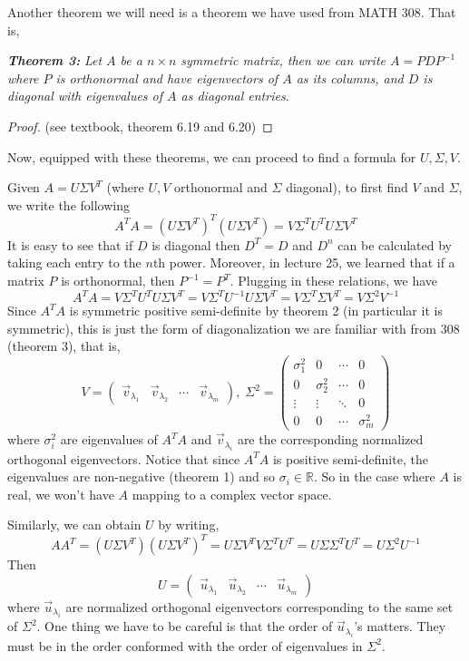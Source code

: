 \documentclass{article}
\begin{document}
Another theorem we will need is a theorem we have used from MATH 308. That is, 
\bigskip

\textit{\textbf{Theorem 3:}} \textit{Let $A$ be a $n \times n $ symmetric matrix, then we can write $A= P D P^{-1}$ where $P$ is orthonormal and have eigenvectors of $A$ as its columns, and $D$ is diagonal with eigenvalues of $A$ as diagonal entries.}

\begin{proof}
(see textbook, theorem 6.19 and 6.20)
\end{proof}
\bigskip 

Now, equipped with these theorems, we can proceed to find a formula for $U, \Sigma, V$. 
\bigskip

Given $A= U \Sigma V^T$ (where $U,V$ orthonormal and $\Sigma$ diagonal), to first find $V$ and $\Sigma$, we write the following 
$$A^TA = ( U \Sigma V^T)^T ( U \Sigma V^T) = V \Sigma^T U^T U \Sigma V^T$$
It is easy to see that if $D$ is diagonal then $D^T = D$ and $D^n$ can be calculated by taking each entry to the $n$th power. Moreover, in lecture 25, we learned that if a matrix $P$ is orthonormal, then $P^{-1} = P^T$. Plugging in these relations, we have 
$$A^TA =V \Sigma^T U^T U \Sigma V^T = V \Sigma^T U^{-1} U \Sigma V^T =V \Sigma^T  \Sigma V^T = V \Sigma^2 V^{-1}$$
Since $A^TA$ is symmetric positive semi-definite by theorem 2 (in particular it is symmetric), this is just the form of diagonalization we are familiar with from 308 (theorem 3), that is, $$V = \begin{pmatrix} \vec{v}_{\lambda_1} & \vec{v}_{\lambda_2} & \cdots & \vec{v}_{\lambda_m} \end{pmatrix}, \; \Sigma^2 = \begin{pmatrix} \sigma^2_1 & 0&  \cdots & 0 \\ 0& \sigma^2_2 &\cdots & 0 \\ \vdots & \vdots & \ddots &0 \\
0 &0& \cdots & \sigma^2_m  \end{pmatrix}$$ 
where $\sigma^2_i$ are eigenvalues of $A^TA$ and $\vec{v}_{\lambda_i}$ are the corresponding normalized orthogonal eigenvectors. Notice that since $A^TA$ is positive semi-definite, the eigenvalues are non-negative (theorem 1) and so $\sigma_i \in \mathbb{R}$. So in the case where $A$ is real, we won't have $A$ mapping to a complex vector space. 
\bigskip

Similarly, we can obtain $U$ by writing,
$$AA^T = (U \Sigma V^T)(U \Sigma V^T)^T = U \Sigma V^T V \Sigma^TU^T = U \Sigma  \Sigma^TU^T = U  \Sigma^2U^{-1}$$
Then 
$$U = \begin{pmatrix} \vec{u}_{\lambda_1} & \vec{u}_{\lambda_2} & \cdots & \vec{u}_{\lambda_m} \end{pmatrix}$$ 
where $\vec{u}_{\lambda_i}$ are normalized orthogonal eigenvectors corresponding to the same set of $\Sigma^2$. One thing we have to be careful is that the order of $\vec{u}_{\lambda_i}$'s matters. They must be in the order conformed with the order of eigenvalues in $\Sigma^2$.
\end{document}
